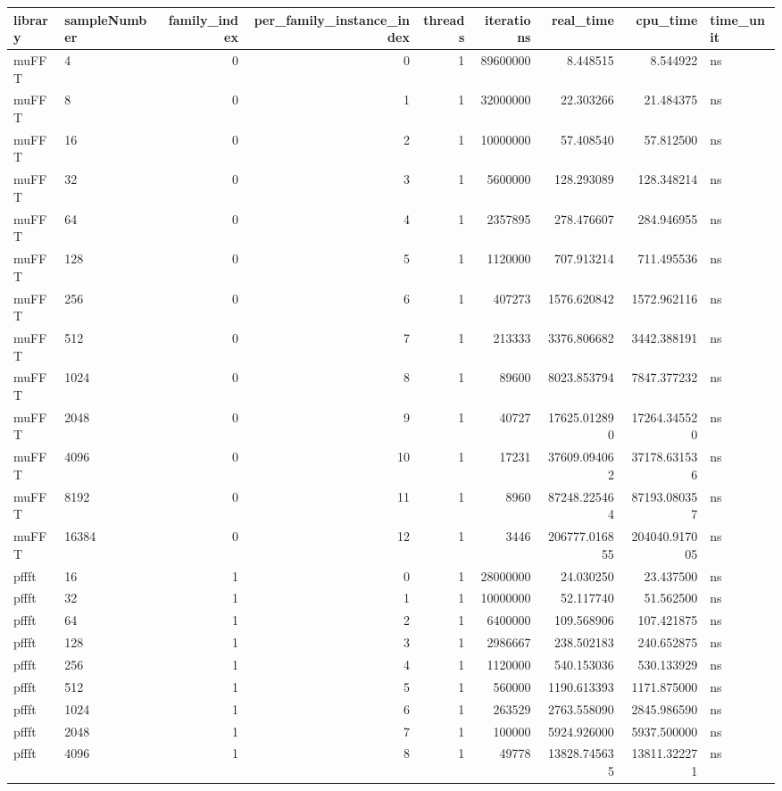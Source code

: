 \begin{tabular}{llrrrrrrl}
\toprule
library & sampleNumber & family\_index & per\_family\_instance\_index & threads & iterations & real\_time & cpu\_time & time\_unit \\
\midrule
muFFT & 4 & 0 & 0 & 1 & 89600000 & 8.448515 & 8.544922 & ns \\
muFFT & 8 & 0 & 1 & 1 & 32000000 & 22.303266 & 21.484375 & ns \\
muFFT & 16 & 0 & 2 & 1 & 10000000 & 57.408540 & 57.812500 & ns \\
muFFT & 32 & 0 & 3 & 1 & 5600000 & 128.293089 & 128.348214 & ns \\
muFFT & 64 & 0 & 4 & 1 & 2357895 & 278.476607 & 284.946955 & ns \\
muFFT & 128 & 0 & 5 & 1 & 1120000 & 707.913214 & 711.495536 & ns \\
muFFT & 256 & 0 & 6 & 1 & 407273 & 1576.620842 & 1572.962116 & ns \\
muFFT & 512 & 0 & 7 & 1 & 213333 & 3376.806682 & 3442.388191 & ns \\
muFFT & 1024 & 0 & 8 & 1 & 89600 & 8023.853794 & 7847.377232 & ns \\
muFFT & 2048 & 0 & 9 & 1 & 40727 & 17625.012890 & 17264.345520 & ns \\
muFFT & 4096 & 0 & 10 & 1 & 17231 & 37609.094062 & 37178.631536 & ns \\
muFFT & 8192 & 0 & 11 & 1 & 8960 & 87248.225464 & 87193.080357 & ns \\
muFFT & 16384 & 0 & 12 & 1 & 3446 & 206777.016855 & 204040.917005 & ns \\
pffft & 16 & 1 & 0 & 1 & 28000000 & 24.030250 & 23.437500 & ns \\
pffft & 32 & 1 & 1 & 1 & 10000000 & 52.117740 & 51.562500 & ns \\
pffft & 64 & 1 & 2 & 1 & 6400000 & 109.568906 & 107.421875 & ns \\
pffft & 128 & 1 & 3 & 1 & 2986667 & 238.502183 & 240.652875 & ns \\
pffft & 256 & 1 & 4 & 1 & 1120000 & 540.153036 & 530.133929 & ns \\
pffft & 512 & 1 & 5 & 1 & 560000 & 1190.613393 & 1171.875000 & ns \\
pffft & 1024 & 1 & 6 & 1 & 263529 & 2763.558090 & 2845.986590 & ns \\
pffft & 2048 & 1 & 7 & 1 & 100000 & 5924.926000 & 5937.500000 & ns \\
pffft & 4096 & 1 & 8 & 1 & 49778 & 13828.745635 & 13811.322271 & ns \\

\end{tabular}
